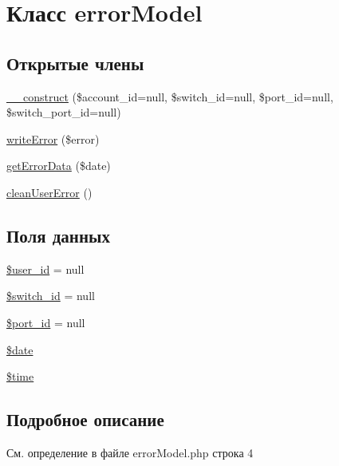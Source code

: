 \hypertarget{classerror_model}{\section{Класс error\-Model}
\label{classerror_model}
}
\subsection*{Открытые члены}
\begin{DoxyCompactItemize}
\item 
\hyperlink{classerror_model_a4ed8d21ed582ab26d9d813e9f44251d7}{\-\_\-\-\_\-construct} (\$account\-\_\-id=null, \$switch\-\_\-id=null, \$port\-\_\-id=null, \$switch\-\_\-port\-\_\-id=null)
\item 
\hyperlink{classerror_model_a268a368bcd4dfaa39b9c393dd1c0b858}{write\-Error} (\$error)
\item 
\hyperlink{classerror_model_a5485c7a0cb6321d59632e75c3d945d09}{get\-Error\-Data} (\$date)
\item 
\hyperlink{classerror_model_a2797be2d07b2b4efc973c5584c28d023}{clean\-User\-Error} ()
\end{DoxyCompactItemize}
\subsection*{Поля данных}
\begin{DoxyCompactItemize}
\item 
\hyperlink{classerror_model_af0fcd925f00973e32f7214859dfb3c6b}{\$user\-\_\-id} = null
\item 
\hyperlink{classerror_model_a21ec74990029279615d417ec27831ccf}{\$switch\-\_\-id} = null
\item 
\hyperlink{classerror_model_ad8662b1c3f632fb3bf4b108a062b7474}{\$port\-\_\-id} = null
\item 
\hyperlink{classerror_model_a481c918f8d853749e00b5942cabf599a}{\$date}
\item 
\hyperlink{classerror_model_a78db1a0602e3b6ac1d9a1b5ec103c160}{\$time}
\end{DoxyCompactItemize}


\subsection{Подробное описание}


См. определение в файле error\-Model.\-php строка 4



